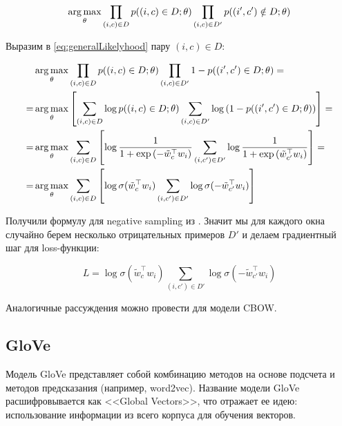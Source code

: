 \begin{equation} \label{eq:generalLikelyhood}
 \operatorname*{arg\,max}_{\theta} \prod_{(i,c)\in D} p((i,c)\in D;\theta) \prod_{(i,c)\in D'} p((i',c')\notin D;\theta)
\end{equation}

Выразим в \ref{eq:generalLikelyhood} пару $(i,c) \in D$:

\begin{equation}
\begin{aligned}
 & \operatorname*{arg\,max}_{\theta} \prod_{(i,c)\in D} p((i,c)\in D;\theta) \prod_{(i,c)\in D'} 1-p((i',c')\in D;\theta) = \\
 = & \operatorname*{arg\,max}_{\theta} \left[\sum_{(i,c)\in D} \log{p((i,c)\in D;\theta)} \sum_{(i,c)\in D'} \log{( 1-p((i',c')\in D;\theta))} \right] = \\
 = & \operatorname*{arg\,max}_{\theta} \sum_{(i,c)\in D} \left[\log{\frac{1}{1+\exp{(-\tilde{w}_c^{\top} w_i)}}} \sum_{(i,c')\in D'} \log{\frac{1}{1+\exp{(\tilde{w}_{c'}^{\top} w_i)}}} \right] = \\
 = & \operatorname*{arg\,max}_{\theta} \sum_{(i,c)\in D} \left[\log\sigma(\tilde{w}_c^{\top} w_i) \sum_{(i,c')\in D'} \log\sigma(-\tilde{w}_{c'}^{\top} w_i)\right]
\end{aligned}
\end{equation}

Получили формулу для negative sampling из \cite{Mikolov:2}. Значит мы для каждого окна случайно берем несколько отрицательных примеров $D'$ и делаем градиентный шаг для loss-функции:

\begin{equation}
 L = \log\sigma(\tilde{w}_c^{\top} w_i) \sum_{(i,c')\in D'} \log\sigma(-\tilde{w}_{c'}^{\top} w_i)
\end{equation}

Аналогичные рассуждения можно провести для модели CBOW.


\subsection{GloVe}

Модель GloVe \cite{Pennington} представляет собой комбинацию методов на основе подсчета и методов предсказания (например, word2vec). Название модели GloVe расшифровывается как <<Global Vectors>>, что отражает ее идею: использование информации из всего корпуса для обучения векторов.






